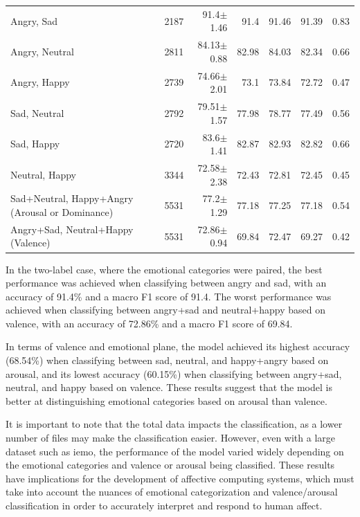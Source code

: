 \begin{table}[H]
\begin{tabular}{lrrrrrr}
    	Angry, Sad                          &         2187 & 91.4$\pm$1.46  &      91.4  &       91.46 &    91.39 &   0.83 \\
    	Angry, Neutral                      &         2811 & 84.13$\pm$0.88 &      82.98 &       84.03 &    82.34 &   0.66 \\
    	Angry, Happy                    	&         2739 & 74.66$\pm$2.01 &      73.1  &       73.84 &    72.72 &   0.47 \\
    	Sad, Neutral                        &         2792 & 79.51$\pm$1.57 &      77.98 &       78.77 &    77.49 &   0.56 \\
    	Sad, Happy                          &         2720 & 83.6$\pm$1.41  &      82.87 &       82.93 &    82.82 &   0.66 \\
    	Neutral, Happy                      &         3344 & 72.58$\pm$2.38 &      72.43 &       72.81 &    72.45 &   0.45 \\
    	Sad+Neutral, Happy+Angry (Arousal or Dominance)  &         5531 & 77.2$\pm$1.29  &      77.18 &       77.25 &    77.18 &   0.54 \\
    	Angry+Sad, Neutral+Happy (Valence)  &         5531 & 72.86$\pm$0.94 &      69.84 &       72.47 &    69.27 &   0.42 \\
    	\bottomrule
    \end{tabular}
\end{table}

In the two-label case, where the emotional categories were paired, the best performance was achieved when classifying between angry and sad, with an accuracy of 91.4\% and a macro F1 score of 91.4. The worst performance was achieved when classifying between angry+sad and neutral+happy based on valence, with an accuracy of 72.86\% and a macro F1 score of 69.84.

In terms of valence and emotional plane, the model achieved its highest accuracy (68.54\%) when classifying between sad, neutral, and happy+angry based on arousal, and its lowest accuracy (60.15\%) when classifying between angry+sad, neutral, and happy based on valence. These results suggest that the model is better at distinguishing emotional categories based on arousal than valence.

It is important to note that the total data impacts the classification, as a lower number of files may make the classification easier. However, even with a large dataset such as \ac{iemo}, the performance of the model varied widely depending on the emotional categories and valence or arousal being classified. These results have implications for the development of affective computing systems, which must take into account the nuances of emotional categorization and valence/arousal classification in order to accurately interpret and respond to human affect.


